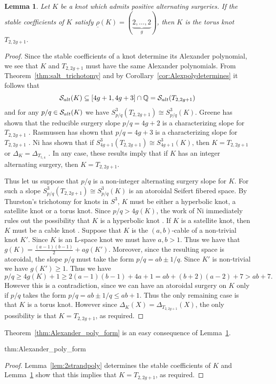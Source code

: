 \documentclass{amsart} %
\newcommand{\Q}{\mathbb{Q}}
\newcommand{\Salt}{\mathcal{S}_{\rm alt}}
\theoremstyle{thm}
\newtheorem{lem}[Theorem]{Lemma}
\theoremstyle{definition}
\numberwithin{equation}{section}
\begin{document}
\begin{lem}\label{lem:T1=2}
Let $K$ be a knot which admits positive alternating surgeries. If the stable coefficients of $K$ satisfy $\underline{\rho}(K)=(\underbrace{2,\dots,2}_{g})$, then $K$ is the torus knot $T_{2,2g+1}$.
\end{lem}
\begin{proof}
Since the stable coefficients of a knot determine its Alexander polynomial, we see that $K$ and $T_{2,2g+1}$ must have the same Alexander polynomials. From Theorem~\ref{thm:salt_trichotomy} and by Corollary~\ref{cor:Alexpolydetermines} it follows that
\[
\Salt(K)\subseteq [4g+1,4g+3]\cap \Q = \Salt(T_{2,2g+1})
\]
and for any $p/q\in \Salt(K)$ we have $S_{p/q}^3(T_{2,2g+1})\cong S_{p/q}^3(K)$. Greene has shown that the reducible surgery slope $p/q=4g+2$ is a characterizing slope for $T_{2,2g+1}$ \cite{Greene2015genusbounds}. Rasmussen has shown that $p/q=4g+3$ is a characterizing slope for $T_{2,2g+1}$ \cite{Rasmussen2007lens}. Ni has shown that if $S_{4g+1}^3(T_{2,2g+1})\cong S_{4g+1}^3(K)$, then $K=T_{2,2g+1}$ or $\Delta_K=\Delta_{T_{5,4}}$ \cite{Ni2020Seifert}. In any case, these results imply that if $K$ has an integer alternating surgery, then $K=T_{2,2g+1}$.

Thus let us suppose that $p/q$ is a non-integer alternating surgery slope for $K$. For such a slope $S_{p/q}^3(T_{2,2g+1})\cong S_{p/q}^3(K)$ is an atoroidal Seifert fibered space. By Thurston's trichotomy for knots in $S^3$, $K$ must be either a hyperbolic knot, a satellite knot or a torus knot. Since $p/q>4g(K)$, the work of Ni immediately rules out the possibility that $K$ is a hyperbolic knot \cite[Theorem~1.1]{Ni2020Seifert}. If $K$ is a satellite knot, then $K$ must be a cable knot \cite[Corollary~1.1]{Miyazaki1997Seifert}. Suppose that $K$ is the $(a,b)$-cable of a non-trivial knot $K'$. Since $K$ is an L-space knot we must have $a,b>1$. Thus we have that $g(K)=\frac{(a-1)(b-1)}{2} + a g(K')$. Moreover, since the resulting space is atoroidal, the slope $p/q$ must take the form $p/q=ab\pm 1/q$. Since $K'$ is non-trivial we have $g(K')\geq 1$. Thus we have
\[
p/q\geq 4g(K)+1\geq 2(a-1)(b-1)+4a +1= ab+(b+2)(a-2)+7>ab+7.
\]
However this is a contradiction, since we can have an atoroidal surgery on $K$ only if $p/q$ takes the form $p/q=ab\pm 1/q\leq ab+1$.
Thus the only remaining case is that $K$ is a torus knot. However since $\Delta_{K}(X)=\Delta_{T_{2,2g+1}}(X)$, the only possibility is that $K=T_{2,2g+1}$, as required.
\end{proof}
Theorem~\ref{thm:Alexander_poly_form} is an easy consequence of Lemma~\ref{lem:T1=2}.
\begin{repthm}{thm:Alexander_poly_form}
    \thmpolyform
\end{repthm}
\begin{proof}
    Lemma~\ref{lem:2strandpoly} determines the stable coefficients of $K$ and Lemma~\ref{lem:T1=2} show that this implies that $K=T_{2,2g+1}$, as required.
\end{proof}
\end{document}
